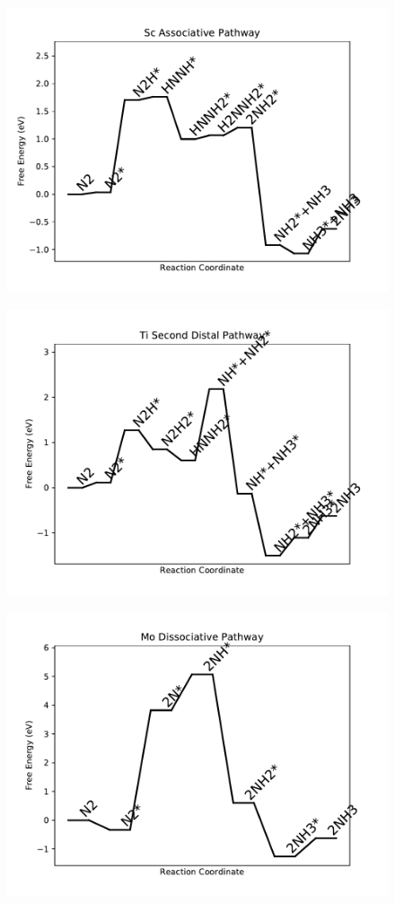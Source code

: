 \begin{figure}
\includegraphics[width=0.8\linewidth]{data/plots/Sc_associative.pdf}
\end{figure}

\begin{figure}
\includegraphics[width=0.8\linewidth]{data/plots/Ti_distal_2.pdf}
\end{figure}

\begin{figure}
\includegraphics[width=0.8\linewidth]{data/plots/Mo_dissociative.pdf}
\end{figure}

